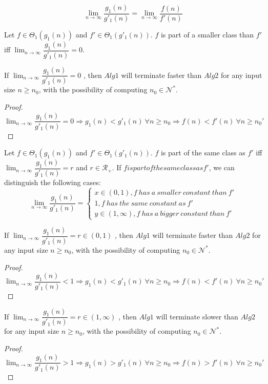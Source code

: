 \begin{remark}
\[\lim_{n\to\infty} \dfrac{g_{1}(n)}{g'_{1}(n)} = \lim_{n\to\infty} \dfrac{f(n)}{f'(n)}\]
\end{remark}

\begin{definition}
Let $f \in \Theta_{1}(g_{1}(n))$ and $f' \in \Theta_{1}(g'_{1}(n))$. $f$ is part of a smaller class than $f'$ iff $\lim_{n\to\infty} \dfrac{g_{1}(n)}{g'_{1}(n)} = 0$.
\end{definition}
\begin{lemma}
If  $ \lim_{n\to\infty} \dfrac{g_{1}(n)}{g'_{1}(n)} = 0 $ , then $Alg1$ will terminate faster than $Alg2$ for any input size $n \geq n_{0}$, with the possibility of computing $n_{0} \in \mathcal{N}^{*}$.
\end{lemma}
\begin{proof}
$\lim_{n\to\infty} \dfrac{g_{1}(n)}{g'_{1}(n)} = 0 \Rightarrow g_{1}(n) < g'_{1}(n)\ \forall n \geq n_{0} \Rightarrow f(n) < f'(n) \ \forall n \geq n_{0}'$
\end{proof}

\begin{definition}
Let $f \in \Theta_{1}(g_{1}(n))$ and $f' \in \Theta_{1}(g'_{1}(n))$. $f$ is part of the same class as $f'$ iff $\lim_{n\to\infty} \dfrac{g_{1}(n)}{g'_{1}(n)} = r$ and $r \in \mathcal{R}_{+}$.
If $f is part of the same class as f'$, we can distinguish the following cases:
$$
\lim_{n\to\infty} \dfrac{g_{1}(n)}{g'_{1}(n)} = 
\begin{cases}
x \in (0,1), f\ has\ a\ smaller\ constant\ than\ f' \\
1, f\ has\ the\ same\ constant\ as\ f'\\
y \in (1,\infty), f\ has\ a\ bigger\ constant\ than\ f'
\end{cases}
$$
\end{definition}

\begin{lemma}
If  $ \lim_{n\to\infty} \dfrac{g_{1}(n)}{g'_{1}(n)} = r \in (0,1) $ , then $Alg1$ will terminate faster than $Alg2$ for any input size $n \geq n_{0}$, with the possibility of computing $n_{0} \in \mathcal{N}^{*}$.
\end{lemma}
\begin{proof}
$\lim_{n\to\infty} \dfrac{g_{1}(n)}{g'_{1}(n)} < 1 \Rightarrow g_{1}(n) < g'_{1}(n)\ \forall n \geq n_{0} \Rightarrow f(n) < f'(n) \ \forall n \geq n_{0}'$
\end{proof}

\begin{lemma}
If  $ \lim_{n\to\infty} \dfrac{g_{1}(n)}{g'_{1}(n)} = r \in (1,\infty) $ , then $Alg1$ will terminate slower than $Alg2$ for any input size $n \geq n_{0}$, with the possibility of computing $n_{0} \in \mathcal{N}^{*}$.
\end{lemma}
\begin{proof}
$\lim_{n\to\infty} \dfrac{g_{1}(n)}{g'_{1}(n)} > 1 \Rightarrow g_{1}(n) > g'_{1}(n)\ \forall n \geq n_{0} \Rightarrow f(n) > f'(n) \ \forall n \geq n_{0}'$
\end{proof}



